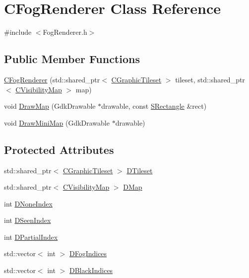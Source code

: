 \hypertarget{classCFogRenderer}{}\section{C\+Fog\+Renderer Class Reference}
\label{classCFogRenderer}


{\ttfamily \#include $<$Fog\+Renderer.\+h$>$}

\subsection*{Public Member Functions}
\begin{DoxyCompactItemize}
\item 
\hyperlink{classCFogRenderer_aa802bea4a0983b7cbcacf4ebfc1cf6a3}{C\+Fog\+Renderer} (std\+::shared\+\_\+ptr$<$ \hyperlink{classCGraphicTileset}{C\+Graphic\+Tileset} $>$ tileset, std\+::shared\+\_\+ptr$<$ \hyperlink{classCVisibilityMap}{C\+Visibility\+Map} $>$ map)
\item 
void \hyperlink{classCFogRenderer_aa7e0638c279ac426b9b643d26a38777e}{Draw\+Map} (Gdk\+Drawable $\ast$drawable, const \hyperlink{structSRectangle}{S\+Rectangle} \&rect)
\item 
void \hyperlink{classCFogRenderer_a818691538177c9a265477847cc2b35ea}{Draw\+Mini\+Map} (Gdk\+Drawable $\ast$drawable)
\end{DoxyCompactItemize}
\subsection*{Protected Attributes}
\begin{DoxyCompactItemize}
\item 
std\+::shared\+\_\+ptr$<$ \hyperlink{classCGraphicTileset}{C\+Graphic\+Tileset} $>$ \hyperlink{classCFogRenderer_af9f3956c6e371f112ee1ce5decd7ae89}{D\+Tileset}
\item 
std\+::shared\+\_\+ptr$<$ \hyperlink{classCVisibilityMap}{C\+Visibility\+Map} $>$ \hyperlink{classCFogRenderer_a06be3616da23b5fce8ab3407b81788a4}{D\+Map}
\item 
int \hyperlink{classCFogRenderer_ac4731c0fcb7e73be9fd6839659e519ba}{D\+None\+Index}
\item 
int \hyperlink{classCFogRenderer_acac9ab2c0a8023661ab1aa096d713458}{D\+Seen\+Index}
\item 
int \hyperlink{classCFogRenderer_aa445569ee9f7ede85d5c2cd4fd9d6fca}{D\+Partial\+Index}
\item 
std\+::vector$<$ int $>$ \hyperlink{classCFogRenderer_a2028e4642e756016819aab6567800af5}{D\+Fog\+Indices}
\item 
std\+::vector$<$ int $>$ \hyperlink{classCFogRenderer_a09e3b546abbe52cc9addd1edfcc5ea9c}{D\+Black\+Indices}
\end{DoxyCompactItemize}



